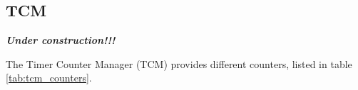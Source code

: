 %
%
%
% 
%
%
%
\subsection{TCM}\label{sec:tcm}
\textbf{\textit{Under construction!!!}}

The Timer Counter Manager (TCM) provides different counters, listed in table \ref{tab:tcm_counters}.

